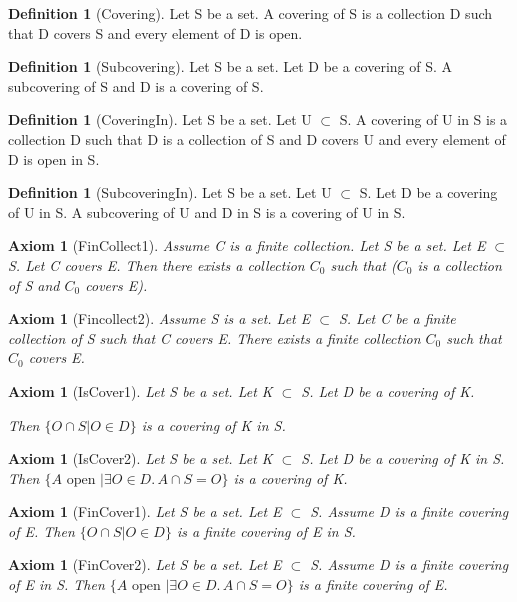 \documentclass[10pt]{article}
\newenvironment{forthel}{\begin{leftbar}}{\end{leftbar}}
\newcommand{\embed}[2]{ \{ A \text{ open } | \exists O\in #1 .\, A\cap #2 = O\}}
\newcommand{\capcap}[2]{ \{ O\cap #2 | O \in #1 \}}
\newcommand{\var}[2]{ #1_{#2}}
\theoremstyle{definition}
\newtheorem{definition}[theorem]{Definition}
\theoremstyle{plain}
\newtheorem{axiom}[theorem]{Axiom}
\theoremstyle{remark}
\begin{document}
\begin{forthel}
	\begin{definition}[Covering]
		Let S be a set. A covering of S is a collection D such that D covers S and every element of D is open.
	\end{definition}

	\begin{definition}[Subcovering]
		Let S be a set. Let D be a covering of S. A subcovering of S and D is a covering of S.
	\end{definition}
	\begin{definition}[CoveringIn]
		Let S be a set. Let U $\subset$ S. A covering of U in S is a collection D such that D is a collection of S and D covers U and every element of D is open in S.
	\end{definition}

	\begin{definition}[SubcoveringIn]
		Let S be a set. Let U $\subset$ S. Let D be a covering of U in S. A subcovering of U and D in S is a covering of U in S.
	\end{definition}
	
	\begin{axiom}[FinCollect1]
		Assume C is a finite collection. Let S be a set. Let E $\subset$ S. Let C covers E. Then there exists a collection $\var C0$ such that ($\var C0$ is a collection of S and $\var C0$ covers E).
	\end{axiom}
	\begin{axiom}[Fincollect2]
		Assume S is a set. Let E $\subset$ S. Let C be a finite collection of S such that C covers E. There exists a finite collection $\var C0$ such that  $\var C0$ covers E.
	\end{axiom}
	\begin{axiom}[IsCover1]
		Let S be a set. Let K $\subset$ S. Let D be a covering of K.

		Then $\capcap{D}{S}$ is a covering of K in S.
	\end{axiom}

	\begin{axiom}[IsCover2]
		Let S be a set. Let K $\subset$ S. Let D be a covering of K in S.
		Then $\embed{D}{S}$ is a covering of K.
	\end{axiom}
	\begin{axiom}[FinCover1]
		Let S be a set. Let E $\subset$ S. Assume D is a finite covering of E. Then $\capcap{D}{S}$ is a finite covering of E in S.
	\end{axiom}

	\begin{axiom}[FinCover2]
		Let S be a set. Let E $\subset$ S. Assume D is a finite covering of E in S. Then $\embed{D}{S}$ is a finite covering of E.
	\end{axiom}
\end{forthel}
\end{document}
